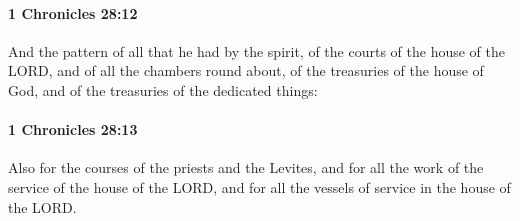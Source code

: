 		\paragraph{1 Chronicles 28:12} %
			\label{1CHRONICLES-28-12}

			And the pattern of all that he had by the spirit, of the courts of the house of the LORD, and of all the chambers round about, of the treasuries of the house of God, and of the treasuries of the dedicated things:


		\paragraph{1 Chronicles 28:13} %
			\label{1CHRONICLES-28-13}

			Also for the courses of the priests and the Levites, and for all the work of the service of the house of the LORD, and for all the vessels of service in the house of the LORD.

